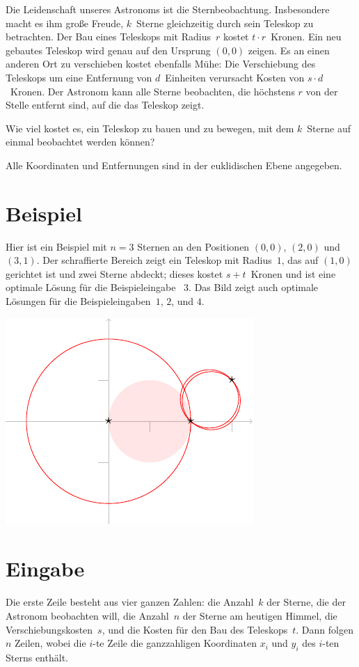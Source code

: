 
\noindent
Die Leidenschaft unseres Astronoms ist die Sternbeobachtung.
Insbesondere macht es ihm große Freude, $k$~Sterne gleichzeitig durch sein Teleskop zu betrachten.   
Der Bau eines Teleskops mit Radius~$r$ kostet $t\cdot r$~Kronen.
Ein neu gebautes Teleskop wird genau auf den Ursprung $(0,0)$ zeigen.
Es an einen anderen Ort zu verschieben kostet ebenfalls Mühe:
Die Verschiebung des Teleskops um eine Entfernung von $d$~Einheiten verursacht Kosten von $s\cdot d$~Kronen.
Der Astronom kann alle Sterne beobachten, die höchstens $r$ von der Stelle entfernt sind, auf die das Teleskop zeigt.

Wie viel kostet es, ein Teleskop zu bauen und zu bewegen, mit dem $k$~Sterne auf einmal beobachtet werden können?


\medskip

Alle Koordinaten und Entfernungen sind in der euklidischen Ebene angegeben.


\section*{Beispiel}

Hier ist ein Beispiel mit $n=3$ Sternen an den Positionen $(0,0)$, $(2,0)$ und $(3,1)$.
Der schraffierte Bereich zeigt ein Teleskop mit Radius~$1$, das auf $(1,0)$ gerichtet ist und zwei Sterne abdeckt; dieses kostet $s + t$~Kronen und ist eine optimale Lösung für die Beispieleingabe ~$3$.
Das Bild zeigt auch optimale Lösungen für die Beispieleingaben~$1$, $2$, und $4$.

\medskip
\noindent
\includegraphics[width=.3\textwidth]{img/samples.pdf}


\section*{Eingabe}

Die erste Zeile besteht aus vier ganzen Zahlen:
die Anzahl~$k$ der Sterne, die der Astronom beobachten will,
die Anzahl~$n$ der Sterne am heutigen Himmel,
die Verschiebungskosten~$s$, und
die Kosten für den Bau des Teleskops~$t$.
Dann folgen $n$ Zeilen, wobei die $i$-te Zeile die ganzzahligen Koordinaten $x_i$ und $y_i$ des $i$-ten Sterns enthält.

